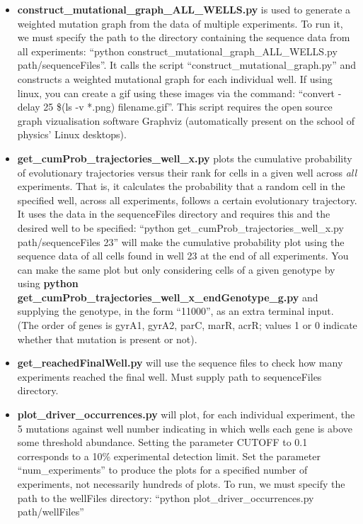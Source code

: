 \documentclass[a4paper,10pt]{article}
\begin{document}
\begin{itemize}
 \item {\bf construct\_mutational\_graph\_ALL\_WELLS.py} is used to generate a weighted mutation graph from the data of multiple experiments. To run it, we must specify
 the path to the directory containing the sequence data from all experiments: ``python construct\_mutational\_graph\_ALL\_WELLS.py path/sequenceFiles''. It calls the 
 script ``construct\_mutational\_graph.py'' and constructs a weighted mutational graph for each individual well.
 If using linux, you can create a gif using these images via the command: ``convert -delay 25 \$(ls -v *.png) filename.gif''.
 This script requires the open source graph vizualisation software Graphviz (automatically present on the school of physics' Linux desktops).
 \item {\bf get\_cumProb\_trajectories\_well\_x.py} plots the cumulative probability of evolutionary trajectories versus their rank for cells in a given well across \emph{all}
 experiments. 
 That is, it calculates the probability that a random cell in the specified well, across all experiments, follows a certain evolutionary trajectory. 
 It uses the data in the sequenceFiles directory and requires this 
 and the desired well to be specified: ``python get\_cumProb\_trajectories\_well\_x.py path/sequenceFiles 23'' will make the cumulative probability plot using the sequence data
 of all cells found in well 23 at the end of all experiments.
 You can make the same plot but only considering cells of a given genotype by using {\bf python get\_cumProb\_trajectories\_well\_x\_endGenotype\_g.py} and supplying the genotype,
 in the form ``11000'', as an extra terminal input. (The order of genes is gyrA1, gyrA2, parC, marR, acrR; values 1 or 0 indicate whether that mutation is present or not).  
 \item {\bf get\_reachedFinalWell.py} will use the sequence files to check how many experiments reached the final well. Must supply path to sequenceFiles directory.
 \item {\bf plot\_driver\_occurrences.py} will plot, for each individual experiment, the 5 mutations against well number indicating in which wells each gene is above some threshold abundance.
 Setting the parameter CUTOFF to 0.1 corresponds to a 10\% experimental detection limit. Set the parameter ``num\_experiments'' to produce the plots for a specified 
 number of experiments, not necessarily hundreds of plots. To run, we must specify the path to the wellFiles directory: ``python plot\_driver\_occurrences.py path/wellFiles''

\end{itemize}
\end{document}
